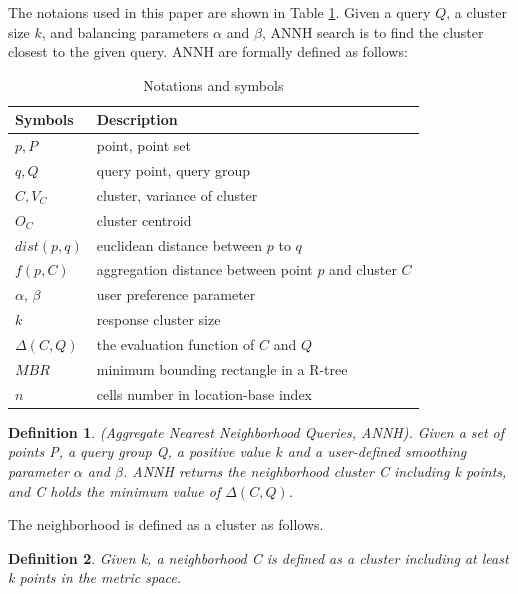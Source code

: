 \documentclass[a4paper,11pt]{report}
\theoremstyle{mytheoremstyle}
\newtheorem{definition}{Definition}
\begin{document}
The notaions used in this paper are shown in Table \ref{tab:var}. Given a query $Q$, a cluster size $k$, and balancing parameters $\alpha$ and $\beta$, ANNH search is to find the cluster closest to the given query. ANNH are formally defined as follows:

\begin{table}
  \begin{center}
  \caption{Notations and symbols}
    \begin{tabular}{|l|l|} \hline
      Symbols & Description \\ \hline \hline
      $p, P$ & point, point set \\ \hline
      $q, Q$ & query point, query group \\ \hline
      $C, V_C$ & cluster, variance of cluster \\ \hline
      $O_C$ & cluster centroid \\ \hline
      $dist(p,q)$ & euclidean distance between $p$ to $q$ \\ \hline
      $f(p, C)$  & aggregation distance between point $p$ and cluster $C$ \\ \hline
      $\alpha$, $\beta$ & user preference parameter \\ \hline
      $k$ & response cluster size \\ \hline
      $\Delta(C,Q)$ & the evaluation function of $C$ and $Q$ \\ \hline
      $MBR$ & minimum bounding rectangle in a R-tree \\ \hline
      $n$ & cells number in location-base index \\ \hline
    \end{tabular}
    \label{tab:var}
  \end{center}
\end{table}

\begin{definition}
(Aggregate Nearest Neighborhood Queries, ANNH). Given a set of points P, a query group Q, a positive value $k$ and a user-defined smoothing parameter $\alpha$ and $\beta$. ANNH returns the neighborhood cluster C including k points, and C holds the minimum value of $\Delta(C, Q)$.
\end{definition}

The neighborhood is defined as a cluster as follows.

\begin{definition}
Given k, a neighborhood C is defined as a cluster including at least k points in the metric space.
\end{definition}
\end{document}
